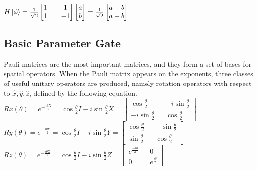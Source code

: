 \\
$H\ket{\phi}=\frac{1}{\sqrt{2}}\begin{bmatrix}
    1 && 1\\
    1 && -1
\end{bmatrix}\begin{bmatrix}
    a\\
    b
\end{bmatrix}=\frac{1}{\sqrt{2}}\begin{bmatrix}
    a+b\\
    a-b
\end{bmatrix}$ %
\\
\subsection{Basic Parameter Gate}
Pauli matrices are the most important matrices, and they form a set of bases for spatial operators. When the Pauli matrix appears on the exponents, three classes of useful unitary operators are produced, namely rotation operators with respect to $\hat{x}, \hat{y}, \hat{z}$, defined by the following equation.\\
    $Rx(\theta)=e^{-\frac{i\theta X}{2}}=\cos{\frac{\theta}{2}}I-i\sin{\frac{\theta}{2}}X=\begin{bmatrix}
        \cos{\frac{\theta}{2}} && -i\sin{\frac{\theta}{2}}\\
        -i\sin{\frac{\theta}{2}} && \cos{\frac{\theta}{2}}
    \end{bmatrix}$ %
\\
    $Ry(\theta)=e^{-\frac{i\theta Y}{2}}=\cos{\frac{\theta}{2}}I-i\sin{\frac{\theta}{2}}Y=\begin{bmatrix}
        \cos{\frac{\theta}{2}} && -\sin{\frac{\theta}{2}}\\
        \sin{\frac{\theta}{2}} && \cos{\frac{\theta}{2}}
    \end{bmatrix}$ %
\\
    $Rz(\theta)=e^{-\frac{i\theta Z}{2}}=\cos{\frac{\theta}{2}}I-i\sin{\frac{\theta}{2}}Z=\begin{bmatrix}
        e^{\frac{-i\theta}{2}} && 0\\
        0 &&  e^{\frac{i\theta}{2}}
    \end{bmatrix}$ %

